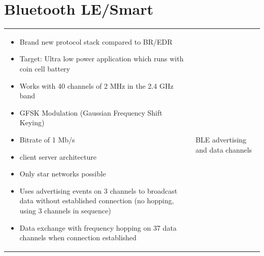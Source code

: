 \section{Bluetooth LE/Smart}
	\begin{tabular}{ll}
		\parbox{8cm}{
			\begin{itemize}
				\item Brand new protocol stack compared to BR/EDR
				\item Target: Ultra low power application which runs with coin cell battery
				\item Works with 40 channels of 2 MHz in the 2.4 GHz band
				\item GFSK Modulation (Gaussian Frequency Shift Keying)
				\item Bitrate of 1 Mb/s
				\item client server architecture
				\item Only star networks possible
				\item Uses advertising events on 3 channels to broadcast data without established connection (no hopping, using 3 channels in sequence)
				\item Data exchange with frequency hopping on 37 data channels when connection established
			\end{itemize}

		}	
		& \parbox{8cm}{
			 \\ BLE advertising and data channels }
	\end{tabular}
	
